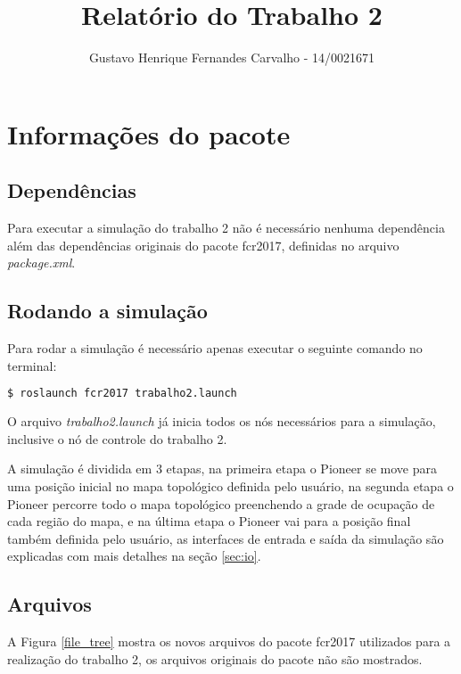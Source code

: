 \documentclass{llncs}
\begin{document}
\title{Relatório do Trabalho 2}
\author{Gustavo Henrique Fernandes Carvalho - 14/0021671}
\maketitle


\section{Informações do pacote}
\subsection{Dependências}
Para executar a simulação do trabalho 2 não é necessário nenhuma dependência além das dependências originais do pacote fcr2017, definidas no arquivo \textit{package.xml}.


\subsection{Rodando a simulação}
Para rodar a simulação é necessário apenas executar o seguinte comando no terminal:
\begin{lstlisting}[language=bash]
	$ roslaunch fcr2017 trabalho2.launch
\end{lstlisting}
O arquivo \textit{trabalho2.launch} já inicia todos os nós necessários para a simulação, inclusive o nó de controle do trabalho 2.

A simulação é dividida em 3 etapas, na primeira etapa o Pioneer se move para uma posição inicial no mapa topológico definida pelo usuário, na segunda etapa o Pioneer percorre todo o mapa topológico preenchendo a grade de ocupação de cada região do mapa, e na última etapa o Pioneer vai para a posição final também  definida pelo usuário, as interfaces de entrada e saída da simulação são explicadas com mais detalhes na seção \ref{sec:io}.


\subsection{Arquivos}
A Figura \ref{file_tree} mostra os novos arquivos do pacote fcr2017 utilizados para a realização do trabalho 2, os arquivos originais do pacote não são mostrados.
\end{document}
